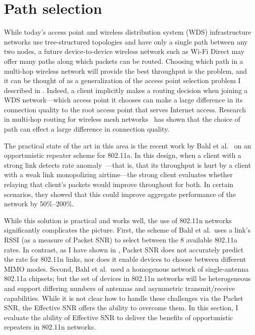 \section{Path selection}\label{sec:esnr_pathsel}
While today's access point and wireless distribution system (WDS) infrastructure networks use tree-structured topologies and have only a single path between any two nodes, a future device-to-device wireless network such as Wi-Fi Direct may offer many paths along which packets can be routed. Choosing which path in a multi-hop wireless network will provide the best throughput is the  problem, and it can be thought of as a generalization of the access point selection problem I described in . Indeed, a client implicitly makes a routing decision when joining a WDS network---which access point it chooses can make a large difference in its connection quality to the root access point that serves Internet access. Research in multi-hop routing for wireless mesh networks~\cite{Bahl_repeater,Rodrig_thesis} has shown that the choice of path can effect a large difference in connection quality.

The practical state of the art in this area is the recent work by Bahl et al.~\cite{Bahl_repeater} on an opportunistic repeater scheme for 802.11a. In this design, when a client with a strong link detects rate anomaly~\cite{Heusse_RateAnomaly}---that is, that its throughput is hurt by a client with a weak link monopolizing airtime---the strong client evaluates whether relaying that client's packets would improve throughout for both. In certain scenarios, they showed that this could improve aggregate performance of the network by 50\%--200\%.

While this solution is practical and works well, the use of 802.11n networks significantly complicates the picture. First, the scheme of Bahl et al.\ uses a link's RSSI (as a measure of Packet SNR) to select between the 8 available 802.11a rates. In contrast, as I have shown in , Packet SNR does not accurately predict the rate for 802.11n links, nor does it enable devices to choose between different MIMO modes. Second, Bahl et al.\ used a homogenous network of single-antenna 802.11a chipsets; but the set of devices in 802.11n networks will be heterogeneous and support differing numbers of antennas and asymmetric transmit/receive capabilities. While it is not clear how to handle these challenges via the Packet SNR, the Effective SNR offers the ability to overcome them. In this section, I evaluate the ability of Effective SNR to deliver the benefits of opportunistic repeaters in 802.11n networks.

